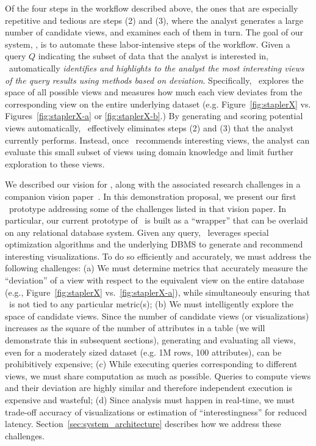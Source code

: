 Of the four steps in the workflow described above, the 
ones that are especially repetitive and tedious are steps (2) and (3),
where the analyst generates a large number of candidate views, and examines each
of them in turn. The goal of our system, \SeeDB, is to automate these
labor-intensive steps of the workflow. Given a query $Q$ indicating the subset
of data that the analyst is interested in, \SeeDB\ automatically {\em identifies and highlights to the analyst the most
interesting views of the query results using methods based on
deviation}. Specifically, \SeeDB\ explores the space of all possible views and
measures how much each view deviates from the corresponding view on the
entire underlying dataset (e.g. Figure~\ref{fig:staplerX} vs.
Figures~\ref{fig:staplerX-a} or \ref{fig:staplerX-b}.) By generating and
scoring potential views automatically, \SeeDB\ effectively eliminates
steps (2) and (3) that the analyst currently performs. Instead, once \SeeDB\
recommends interesting views, the analyst can evaluate this small
subset of views using domain knowledge and limit further
exploration to these views.  

We described our vision for \SeeDB, along with the associated research
challenges in a companion vision paper~\cite{DBLP:conf/vldb/Parameswaran2013}.
In this demonstration proposal, we present our first \SeeDB\ prototype
addressing some of the challenges listed in that vision paper.
In particular, our current prototype of \SeeDB\ is built as a ``wrapper'' that
can be overlaid on any relational database system. Given any query, \SeeDB\
leverages special optimization algorithms and the underlying DBMS to generate
and recommend interesting visualizations. To do so efficiently and accurately,
we must address the following challenges:
(a) We must determine metrics that accurately measure the ``deviation'' of a
view with respect to the equivalent view on the entire database (e.g.,
Figure~\ref{fig:staplerX} vs.~\ref{fig:staplerX-a}), while simultaneouly
ensuring that \SeeDB\ is not tied to any particular metric(s); (b) We must
intelligently explore the space of candidate views. Since the number of
candidate views (or visualizations) increases as the square of the number of
attributes in a table (we will demonstrate this in subsequent sections),
generating and evaluating all views, even for a moderately sized dataset (e.g.
1M rows, 100 attributes), can be prohibitively expensive;
(c) While executing queries corresponding to different views, we must share
computation as much as possible. Queries to compute views and their
deviation are highly similar and therefore
independent execution is expensive and wasteful; (d) Since
analysis must happen in real-time, we must trade-off accuracy
of visualizations or estimation of ``interestingness'' for reduced latency.
Section~\ref{sec:system_architecture} describes how we address these challenges.



